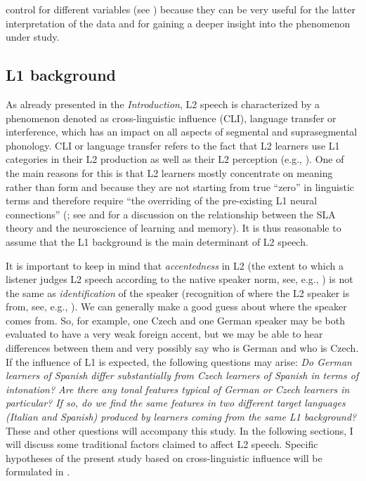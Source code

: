 control for different variables (see \citealt[5]{ColantoniEtAl2015}) because they can be very useful for the latter interpretation of the data and for gaining a deeper insight into the phenomenon under study.

\subsection{L1 background}\label{sec:2.1.1}\largerpage[2]

As already presented in the \textit{Introduction}, L2 speech is characterized by a phenomenon denoted as cross-linguistic influence (CLI), language transfer or interference, which has an impact on all aspects of segmental and suprasegmental phonology. CLI or language transfer refers to the fact that L2 learners use L1 categories in their L2 production as well as their L2 perception (e.g., \citealt{Gass1984,Gass1996, Odlin1989,Odlin2003, Selinker1993, ColantoniEtAl2015}). One of the main reasons for this is that L2 learners mostly concentrate on meaning rather than form and because they are not starting from true “zero” in linguistic terms and therefore require “the overriding of the pre-existing L1 neural connections” (\citealt[90]{Kivistö-deSouza2015}; see \citealt{N.C.Ellis2002} and \citealt{R.Ellis2009} for a discussion on the relationship between the SLA theory and the neuroscience of learning and memory). It is thus reasonable to assume that the L1 background is the main determinant of L2 speech.


It is important to keep in mind that \textit{accentedness} in L2 (the extent to which a listener judges L2 speech according to the native speaker norm, see, e.g., \citealt{Piske2008}) is not the same as \textit{identification} of the speaker (recognition of where the L2 speaker is from, see, e.g., \citealt{KollyDellwo2013}). We can generally make a good guess about where the speaker comes from. So, for example, one Czech and one German speaker may be both evaluated to have a very weak foreign accent, but we may be able to hear differences between them and very possibly say who is German and who is Czech. If the influence of L1 is expected, the following questions may arise: \textit{Do German learners of Spanish differ substantially from Czech learners of Spanish in terms of intonation? Are there any tonal features typical of German or Czech learners in particular? If so, do we find the same features in two different target languages (Italian and Spanish) produced by learners coming from the same L1 background?} These and other questions will accompany this study. In the following sections, I will discuss some traditional factors claimed to affect L2 speech. Specific hypotheses of the present study based on cross-linguistic influence will be formulated in .


